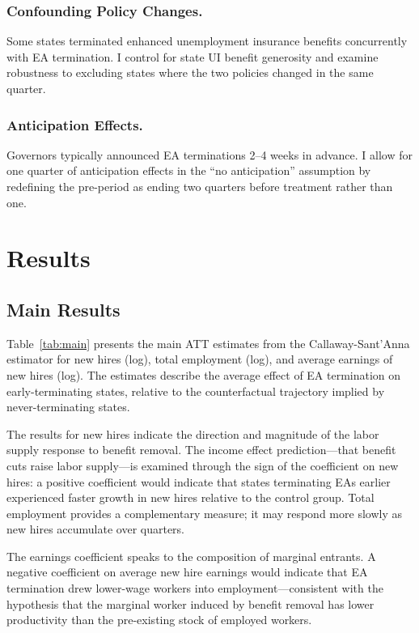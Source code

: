 \documentclass[12pt]{article}
\begin{document}
\subsubsection*{Confounding Policy Changes.} Some states terminated enhanced unemployment insurance benefits concurrently with EA termination. I control for state UI benefit generosity and examine robustness to excluding states where the two policies changed in the same quarter.

\subsubsection*{Anticipation Effects.} Governors typically announced EA terminations 2--4 weeks in advance. I allow for one quarter of anticipation effects in the ``no anticipation'' assumption by redefining the pre-period as ending two quarters before treatment rather than one.

\section{Results}

\subsection{Main Results}



Table~\ref{tab:main} presents the main ATT estimates from the Callaway-Sant'Anna estimator for new hires (log), total employment (log), and average earnings of new hires (log). The estimates describe the average effect of EA termination on early-terminating states, relative to the counterfactual trajectory implied by never-terminating states.

The results for new hires indicate the direction and magnitude of the labor supply response to benefit removal. The income effect prediction---that benefit cuts raise labor supply---is examined through the sign of the coefficient on new hires: a positive coefficient would indicate that states terminating EAs earlier experienced faster growth in new hires relative to the control group. Total employment provides a complementary measure; it may respond more slowly as new hires accumulate over quarters.

The earnings coefficient speaks to the composition of marginal entrants. A negative coefficient on average new hire earnings would indicate that EA termination drew lower-wage workers into employment---consistent with the hypothesis that the marginal worker induced by benefit removal has lower productivity than the pre-existing stock of employed workers.
\end{document}
